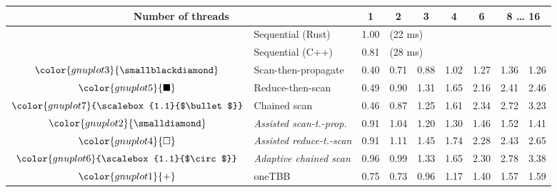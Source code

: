 \begin{tabular}{clrrrrrrr}
\toprule
\multicolumn{2}{c}{\textbf{Number of threads}} & \multicolumn{1}{c}{\textbf{ 1 }} & \multicolumn{1}{c}{\textbf{ 2 }} & \multicolumn{1}{c}{\textbf{ 3 }} & \multicolumn{1}{c}{\textbf{ 4 }} & \multicolumn{1}{c}{\textbf{ 6 }} & \multicolumn{2}{c}{\textbf{ 8 } \dots \textbf{ 16 }} \\
\midrule
& Sequential (Rust) & \multicolumn{1}{r}{ 1.00 } & \multicolumn{ 6 }{l}{(22 ms)} \\
& Sequential (C++) & \multicolumn{1}{r}{ 0.81 } & \multicolumn{ 6 }{l}{(28 ms)} \\
\rowcolor{gnuplot3!10}$\color{gnuplot3}{\smallblackdiamond}$ & Scan-then-propagate & \cellcolor{gnuplot3!10} 0.40 & \cellcolor{gnuplot3!10} 0.71 & \cellcolor{gnuplot3!10} 0.88 & \cellcolor{gnuplot3!10} 1.02 & \cellcolor{gnuplot3!10} 1.27 & \cellcolor{gnuplot3!10} 1.36 & \cellcolor{gnuplot3!10} 1.26 \\
\rowcolor{gnuplot5!10}$\color{gnuplot5}{\blacksquare}$ & Reduce-then-scan & \cellcolor{gnuplot5!10} 0.49 & \cellcolor{gnuplot5!10} 0.90 & \cellcolor{gnuplot5!10} 1.31 & \cellcolor{gnuplot5!10} 1.65 & \cellcolor{gnuplot5!10} 2.16 & \cellcolor{gnuplot5!10} 2.41 & \cellcolor{gnuplot5!10} 2.46 \\
\rowcolor{gnuplot7!10}$\color{gnuplot7}{\scalebox{1.1}{$\bullet$}}$ & Chained scan & \cellcolor{gnuplot7!10} 0.46 & \cellcolor{gnuplot7!10} 0.87 & \cellcolor{gnuplot7!10} 1.25 & \cellcolor{gnuplot7!10} 1.61 & \cellcolor{gnuplot7!10} 2.34 & \cellcolor{gnuplot7!10} 2.72 & \cellcolor{gnuplot7!10} 3.23 \\
\rowcolor{gnuplot2!30}$\color{gnuplot2}{\smalldiamond}$ & \textit{Assisted scan-t.-prop.} & \cellcolor{gnuplot2!30} 0.91 & \cellcolor{gnuplot2!30} 1.04 & \cellcolor{gnuplot2!30} 1.20 & \cellcolor{gnuplot2!30} 1.30 & \cellcolor{gnuplot2!30} 1.46 & \cellcolor{gnuplot2!30} 1.52 & \cellcolor{gnuplot2!30} 1.41 \\
\rowcolor{gnuplot4!30}$\color{gnuplot4}{\square}$ & \textit{Assisted reduce-t.-scan} & \cellcolor{gnuplot4!30} 0.91 & \cellcolor{gnuplot4!30} 1.11 & \cellcolor{gnuplot4!30} 1.45 & \cellcolor{gnuplot4!30} 1.74 & \cellcolor{gnuplot4!30} 2.28 & \cellcolor{gnuplot4!30} 2.43 & \cellcolor{gnuplot4!30} 2.65 \\
\rowcolor{gnuplot6!30}$\color{gnuplot6}{\scalebox{1.1}{$\circ$}}$ & \textit{Adaptive chained scan} & \cellcolor{gnuplot6!30} 0.96 & \cellcolor{gnuplot6!30} 0.99 & \cellcolor{gnuplot6!30} 1.33 & \cellcolor{gnuplot6!30} 1.65 & \cellcolor{gnuplot6!30} 2.30 & \cellcolor{gnuplot6!30} 2.78 & \cellcolor{gnuplot6!30} 3.38 \\
\rowcolor{gnuplot1!10}$\color{gnuplot1}{+}$ & oneTBB & \cellcolor{gnuplot1!10} 0.75 & \cellcolor{gnuplot1!10} 0.73 & \cellcolor{gnuplot1!10} 0.96 & \cellcolor{gnuplot1!10} 1.17 & \cellcolor{gnuplot1!10} 1.40 & \cellcolor{gnuplot1!10} 1.57 & \cellcolor{gnuplot1!10} 1.59 \\
\bottomrule
\end{tabular}
